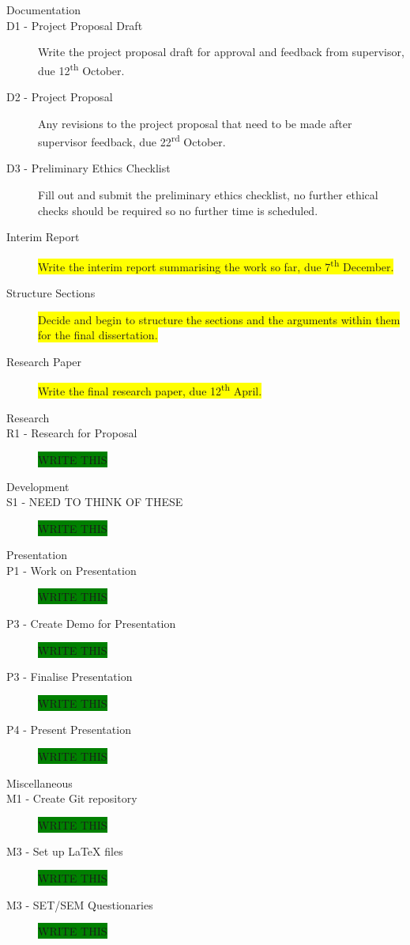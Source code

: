 \documentclass[a4paper]{article}
\begin{document}
\begin{description}
\item [\large{Documentation}]
\item [D1 - Project Proposal Draft]
Write the project proposal draft for approval and feedback from supervisor, due 12\textsuperscript{th} October.
\item [D2 - Project Proposal]
Any revisions to the project proposal that need to be made after supervisor feedback, due 22\textsuperscript{rd} October.
\item [D3 - Preliminary Ethics Checklist]
Fill out and submit the preliminary ethics checklist, no further ethical checks should be required so no further time is scheduled.

\item [Interim Report]
\colorbox{yellow}{Write the interim report summarising the work so far, due 7\textsuperscript{th} December.}
\item [Structure Sections]
\colorbox{yellow}{Decide and begin to structure the sections and the arguments within them for the final dissertation.}
\item [Research Paper]
\colorbox{yellow}{Write the final research paper, due 12\textsuperscript{th} April.}

\item [\large{Research}]
\item [R1 - Research for Proposal]
\colorbox{green}{WRITE THIS}

\item [\large{Development}]
\item [S1 - NEED TO THINK OF THESE]
\colorbox{green}{WRITE THIS}

\item [\large{Presentation}]
\item [P1 - Work on Presentation]
\colorbox{green}{WRITE THIS}
\item [P3 - Create Demo for Presentation]
\colorbox{green}{WRITE THIS}
\item [P3 - Finalise Presentation]
\colorbox{green}{WRITE THIS}
\item [P4 - Present Presentation]
\colorbox{green}{WRITE THIS}

\item [\large{Miscellaneous}]
\item [M1 - Create Git repository]
\colorbox{green}{WRITE THIS}
\item [M3 - Set up LaTeX files]
\colorbox{green}{WRITE THIS}
\item [M3 - SET/SEM Questionaries]
\colorbox{green}{WRITE THIS}


\end{description}
\end{document}
